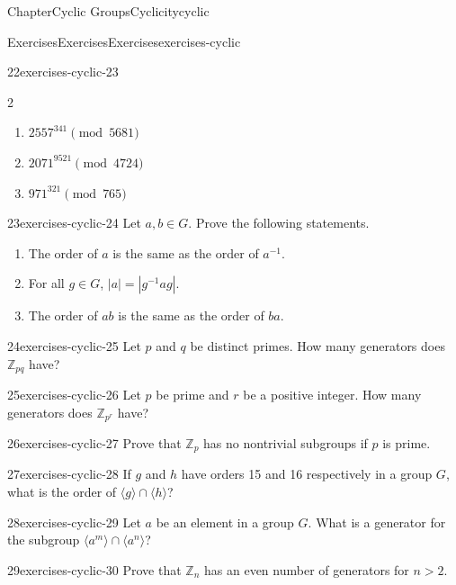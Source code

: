 \documentclass[oneside,10pt,]{book}
\numberwithin{equation}{section}
\newcommand{\gt}{>}
\begin{document}
\begin{chapterptx}{Chapter}{Cyclic Groups}{}{Cyclicity}{}{}{cyclic}
\begin{exercises-section}{Exercises}{Exercises}{}{Exercises}{}{}{exercises-cyclic}
\begin{divisionexercise}{22}{}{}{exercises-cyclic-23}
\begin{multicols}{2}
\begin{enumerate}[label={(\alph*)}]
\item{}\(\displaystyle 2557^{ 341} \pmod{ 5681}\)%
\item{}\(\displaystyle 2071^{ 9521} \pmod{ 4724}\)%
\item{}\(\displaystyle 971^{ 321} \pmod{ 765}\)%
\end{enumerate}
\end{multicols}
\end{divisionexercise}%
\begin{divisionexercise}{23}{}{}{exercises-cyclic-24}%
Let \(a, b \in G\).  Prove the following statements.%
%
\begin{enumerate}[label={(\alph*)}]
\item{}The order of \(a\) is the same as the order of \(a^{-1}\).%
\item{}For all \(g \in G\), \(|a| = |g^{-1}ag|\).%
\item{}The order of \(ab\) is the same as the order of \(ba\).%
\end{enumerate}
\end{divisionexercise}%
\begin{divisionexercise}{24}{}{}{exercises-cyclic-25}%
Let \(p\) and \(q\) be distinct primes.  How many generators does \({\mathbb  Z}_{pq}\) have?%
\end{divisionexercise}%
\begin{divisionexercise}{25}{}{}{exercises-cyclic-26}%
Let \(p\) be prime and \(r\) be a positive integer. How many generators does \({\mathbb Z}_{p^r}\) have?%
\end{divisionexercise}%
\begin{divisionexercise}{26}{}{}{exercises-cyclic-27}%
Prove that  \({\mathbb Z}_{p}\) has no nontrivial subgroups if \(p\) is prime.%
\end{divisionexercise}%
\begin{divisionexercise}{27}{}{}{exercises-cyclic-28}%
If \(g\) and \(h\) have orders 15 and 16 respectively in a group \(G\), what is the order of \(\langle g \rangle  \cap \langle h \rangle \)?%
\end{divisionexercise}%
\begin{divisionexercise}{28}{}{}{exercises-cyclic-29}%
Let \(a\) be an element in a group \(G\). What is a generator for the subgroup \(\langle a^m \rangle  \cap  \langle a^n \rangle\)?%
\end{divisionexercise}%
\begin{divisionexercise}{29}{}{}{exercises-cyclic-30}%
Prove that \({\mathbb Z}_n\) has an even number of generators for \(n \gt 2\).%

\end{divisionexercise}
\end{exercises-section}
\end{chapterptx}
\end{document}
